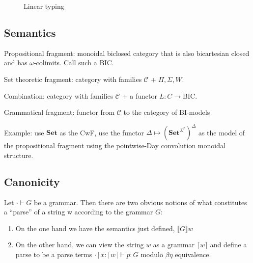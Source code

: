 \documentclass[sigconf,anonymous,review,screen]{acmart}
\newcommand{\Set}{\mathbf{Set}}
\newcommand{\subst}[3]{#1\{#2/#3\}}
\newcommand{\amp}{\mathrel{\&}}
\newif\ifdraft
\newcommand{\pedro}[1]{\ifdraft{\color{red}[{\bf Pedro}: #1]}\fi}
\newcommand{\pipe}{\,|\,}
\begin{document}
\begin{figure}
  \caption{Linear typing}
\end{figure}

\pedro{Need to figure out the rules for inductive types and write down
the judgemental equality rules}
\subsection{Semantics}

Propositional fragment: monoidal biclosed category that is also
bicartesian closed and has $\omega$-colimits. Call such a BIC.

Set theoretic fragment: category with families $\mathcal C$ + $\Pi,\Sigma,W$.

Combination: category with families $\mathcal C$ + a functor $L : C
\to \textrm{BIC}$.

Grammatical fragment: functor from $\mathcal C$ to the category of BI-models

Example: use $\Set$ as the CwF, use the functor $\Delta \mapsto
(\Set^{\Sigma^*})^\Delta$ as the model of the propositional fragment
using the pointwise-Day convolution monoidal structure.

\subsection{Canonicity}

Let $\cdot \vdash G$ be a grammar. Then there are
two obvious notions of what constitutes a ``parse'' of a string w
according to the grammar $G$:
\begin{enumerate}
\item On the one hand we have the semantics just defined, $\llbracket G \rrbracket w$
\item On the other hand, we can view the string $w$ as a grammar
  $\lceil w \rceil$ and define a parse to be a parse terms $\cdot\pipe
  x:\lceil w \rceil \vdash p : G$ modulo $\beta\eta$ equivalence.
\end{enumerate}
\end{document}
